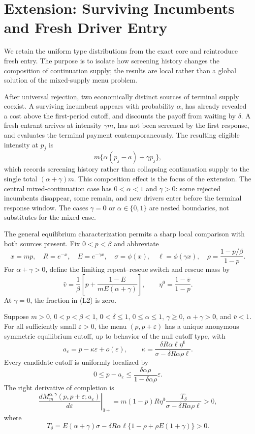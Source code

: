 \documentclass[mnsc,blindrev]{informs3}
\newcommand{\ph}{\phi}
\begin{document}
\section{Extension: Surviving Incumbents and Fresh Driver Entry}
\label{sec:localentry}

We retain the uniform type distributions from the exact core and reintroduce
fresh entry.  The purpose is to isolate how screening history changes the
composition of continuation supply; the results are local rather than a
global solution of the mixed-supply menu problem.

After universal rejection, two economically distinct sources of terminal
supply coexist.  A surviving incumbent appears with probability $\alpha$,
has already revealed a cost above the first-period cutoff, and discounts the
payoff from waiting by $\delta$.  A fresh entrant arrives at intensity
$\gamma m$, has not been screened by the first response, and evaluates the
terminal payment contemporaneously.  The resulting eligible intensity at
$p_j$ is
\[
 m\{\alpha(p_j-a)+\gamma p_j\},
\]
which records screening history rather than collapsing continuation supply
to the single total $(\alpha+\gamma)m$.  This composition effect is the focus
of the extension.  The central mixed-continuation case has
$0<\alpha<1$ and $\gamma>0$: some rejected incumbents disappear, some remain,
and new drivers enter before the terminal response window.  The cases
$\gamma=0$ or $\alpha\in\{0,1\}$ are nested boundaries, not substitutes for
the mixed case.

The general equilibrium characterization permits a sharp local comparison
with both sources present.  Fix $0<p<\beta$ and abbreviate
\[
 x=mp,\quad R=e^{-x},\quad E=e^{-\gamma x},\quad
 \sigma=\ph(x),\quad \ell=\ph(\gamma x),\quad
 \rho=\frac{1-p/\beta}{1-p}.                               \tag{L1}
\]
For $\alpha+\gamma>0$, define the limiting repeat--rescue switch and rescue
mass by
\[
 \bar v=\frac1\beta\left[p+
  \frac{1-E}{mE(\alpha+\gamma)}\right],\qquad
 \eta^0=\frac{1-\bar v}{1-p}.                              \tag{L2}
\]
At $\gamma=0$, the fraction in (L2) is zero.

\begin{theorem}
\label{thm:localentry}
Suppose $m>0$, $0<p<\beta<1$, $0<\delta\le1$,
$0\le\alpha\le1$, $\gamma\ge0$,
$\alpha+\gamma>0$, and $\bar v<1$.  For all sufficiently small
$\varepsilon>0$, the menu $(p,p+\varepsilon)$ has a unique anonymous
symmetric equilibrium cutoff, up to behavior of the null cutoff type, with
\[
 a_\varepsilon=p-\kappa\varepsilon+o(\varepsilon),\qquad
 \kappa=\frac{\delta R\alpha\ell\eta^0}
 {\sigma-\delta R\alpha\rho\ell}.                       \tag{L3}
\]
Every candidate cutoff is uniformly localized by
\[
 0\le p-a_\varepsilon
 \le\frac{\delta\alpha\rho}{1-\delta\alpha\rho}
 \varepsilon.                                                \tag{L4}
\]
The right derivative of completion is
\[
 \left.\frac{dM_m^{\alpha,\gamma}(p,p+\varepsilon;
 a_\varepsilon)}{d\varepsilon}\right|_{0+}
 =m(1-p)R\eta^0
 \frac{T_\delta}{\sigma-\delta R\alpha\rho\ell}>0,       \tag{L5}
\]
where
\[
 T_\delta=E(\alpha+\gamma)\sigma
 -\delta R\alpha\ell\{1-\rho+\rho E(1+\gamma)\}>0.       \tag{L6}
\]
\end{theorem}
\end{document}

